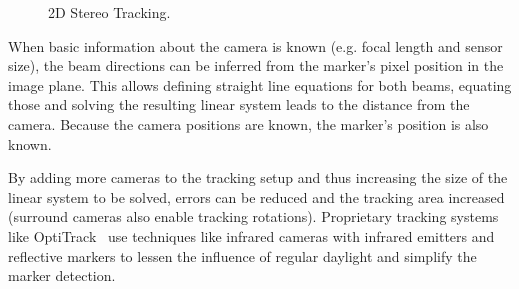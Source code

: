 \begin{figure}[h]
  \centering
  \begin{subfigure}[b]{0.75\textwidth}
  \end{subfigure}
  \caption{2D Stereo Tracking.}
  \label{fig:2dstereotracking}
\end{figure}

When basic information about the camera is known (e.g. focal length and sensor size),
the beam directions can be inferred from the marker's pixel position in the image plane.
This allows defining straight line equations for both beams,
equating those and solving the resulting linear system leads to the distance from the camera.
Because the camera positions are known, the marker's position is also known.

By adding more cameras to the tracking setup and thus increasing the size of the linear system to be solved,
errors can be reduced and the tracking area increased (surround cameras also enable tracking rotations).
Proprietary tracking systems like OptiTrack~\autocite{optitrack} use techniques like infrared cameras with infrared emitters and reflective markers
to lessen the influence of regular daylight and simplify the marker detection.

